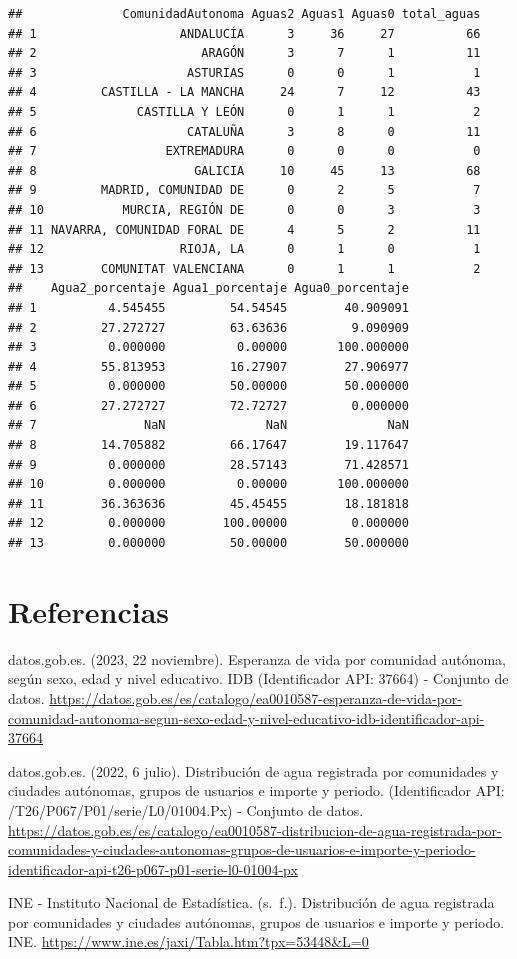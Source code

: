 \documentclass[
]{article}
\begin{document}
\begin{verbatim}
##              ComunidadAutonoma Aguas2 Aguas1 Aguas0 total_aguas
## 1                    ANDALUCÍA      3     36     27          66
## 2                       ARAGÓN      3      7      1          11
## 3                     ASTURIAS      0      0      1           1
## 4         CASTILLA - LA MANCHA     24      7     12          43
## 5              CASTILLA Y LEÓN      0      1      1           2
## 6                     CATALUÑA      3      8      0          11
## 7                  EXTREMADURA      0      0      0           0
## 8                      GALICIA     10     45     13          68
## 9         MADRID, COMUNIDAD DE      0      2      5           7
## 10           MURCIA, REGIÓN DE      0      0      3           3
## 11 NAVARRA, COMUNIDAD FORAL DE      4      5      2          11
## 12                   RIOJA, LA      0      1      0           1
## 13        COMUNITAT VALENCIANA      0      1      1           2
##    Agua2_porcentaje Agua1_porcentaje Agua0_porcentaje
## 1          4.545455         54.54545        40.909091
## 2         27.272727         63.63636         9.090909
## 3          0.000000          0.00000       100.000000
## 4         55.813953         16.27907        27.906977
## 5          0.000000         50.00000        50.000000
## 6         27.272727         72.72727         0.000000
## 7               NaN              NaN              NaN
## 8         14.705882         66.17647        19.117647
## 9          0.000000         28.57143        71.428571
## 10         0.000000          0.00000       100.000000
## 11        36.363636         45.45455        18.181818
## 12         0.000000        100.00000         0.000000
## 13         0.000000         50.00000        50.000000
\end{verbatim}

\hypertarget{referencias}{%
\section{Referencias}\label{referencias}}

datos.gob.es. (2023, 22 noviembre). Esperanza de vida por comunidad
autónoma, según sexo, edad y nivel educativo. IDB (Identificador API:
37664) - Conjunto de datos.
\url{https://datos.gob.es/es/catalogo/ea0010587-esperanza-de-vida-por-comunidad-autonoma-segun-sexo-edad-y-nivel-educativo-idb-identificador-api-37664}

datos.gob.es. (2022, 6 julio). Distribución de agua registrada por
comunidades y ciudades autónomas, grupos de usuarios e importe y
periodo. (Identificador API: /T26/P067/P01/serie/L0/01004.Px) - Conjunto
de datos.
\url{https://datos.gob.es/es/catalogo/ea0010587-distribucion-de-agua-registrada-por-comunidades-y-ciudades-autonomas-grupos-de-usuarios-e-importe-y-periodo-identificador-api-t26-p067-p01-serie-l0-01004-px}

INE - Instituto Nacional de Estadística. (s.~f.). Distribución de agua
registrada por comunidades y ciudades autónomas, grupos de usuarios e
importe y periodo. INE.
\url{https://www.ine.es/jaxi/Tabla.htm?tpx=53448\&L=0}
\end{document}
